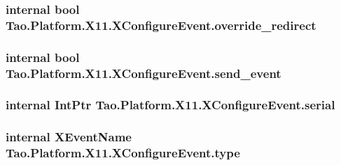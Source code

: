\label{struct_tao_1_1_platform_1_1_x11_1_1_x_configure_event_af68970c4163eddd9f826bc85caf7f581}
\hypertarget{struct_tao_1_1_platform_1_1_x11_1_1_x_configure_event_a53ecd1cf43d8f10f29ebb654731bf8b3}{
\subsubsection[{override\_\-redirect}]{\setlength{\rightskip}{0pt plus 5cm}internal bool {\bf Tao.Platform.X11.XConfigureEvent.override\_\-redirect}}}
\label{struct_tao_1_1_platform_1_1_x11_1_1_x_configure_event_a53ecd1cf43d8f10f29ebb654731bf8b3}
\hypertarget{struct_tao_1_1_platform_1_1_x11_1_1_x_configure_event_a901789bf5f29eec2d989ca6eacb15cb4}{
\subsubsection[{send\_\-event}]{\setlength{\rightskip}{0pt plus 5cm}internal bool {\bf Tao.Platform.X11.XConfigureEvent.send\_\-event}}}
\label{struct_tao_1_1_platform_1_1_x11_1_1_x_configure_event_a901789bf5f29eec2d989ca6eacb15cb4}
\hypertarget{struct_tao_1_1_platform_1_1_x11_1_1_x_configure_event_a271d25119df53a343032348038a62e31}{
\subsubsection[{serial}]{\setlength{\rightskip}{0pt plus 5cm}internal IntPtr {\bf Tao.Platform.X11.XConfigureEvent.serial}}}
\label{struct_tao_1_1_platform_1_1_x11_1_1_x_configure_event_a271d25119df53a343032348038a62e31}
\hypertarget{struct_tao_1_1_platform_1_1_x11_1_1_x_configure_event_a3060f09d3cd6503d0276dc9c0bce8f1e}{
\subsubsection[{type}]{\setlength{\rightskip}{0pt plus 5cm}internal {\bf XEventName} {\bf Tao.Platform.X11.XConfigureEvent.type}}}
